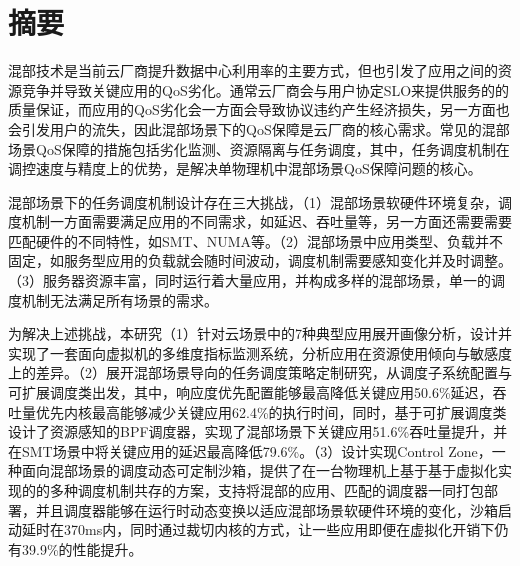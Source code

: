 
\maketitle%
\MAKETITLE%
\makedeclaration%
\intobmk\chapter*{摘\quad 要}%
\setcounter{page}{1}%


混部技术是当前云厂商提升数据中心利用率的主要方式，但也引发了应用之间的资源竞争并导致关键应用的QoS劣化。通常云厂商会与用户协定SLO来提供服务的的质量保证，而应用的QoS劣化会一方面会导致协议违约产生经济损失，另一方面也会引发用户的流失，因此混部场景下的QoS保障是云厂商的核心需求。常见的混部场景QoS保障的措施包括劣化监测、资源隔离与任务调度，其中，任务调度机制在调控速度与精度上的优势，是解决单物理机中混部场景QoS保障问题的核心。

混部场景下的任务调度机制设计存在三大挑战，（1）混部场景软硬件环境复杂，调度机制一方面需要满足应用的不同需求，如延迟、吞吐量等，另一方面还需要需要匹配硬件的不同特性，如SMT、NUMA等。（2）混部场景中应用类型、负载并不固定，如服务型应用的负载就会随时间波动，调度机制需要感知变化并及时调整。（3）服务器资源丰富，同时运行着大量应用，并构成多样的混部场景，单一的调度机制无法满足所有场景的需求。

为解决上述挑战，本研究（1）针对云场景中的7种典型应用展开画像分析，设计并实现了一套面向虚拟机的多维度指标监测系统，分析应用在资源使用倾向与敏感度上的差异。（2）展开混部场景导向的任务调度策略定制研究，从调度子系统配置与可扩展调度类出发，其中，响应度优先配置能够最高降低关键应用50.6\%延迟，吞吐量优先内核最高能够减少关键应用62.4\%的执行时间，同时，基于可扩展调度类设计了资源感知的BPF调度器，实现了混部场景下关键应用51.6\%吞吐量提升，并在SMT场景中将关键应用的延迟最高降低79.6\%。（3）设计实现Control Zone，一种面向混部场景的调度动态可定制沙箱，提供了在一台物理机上基于基于虚拟化实现的的多种调度机制共存的方案，支持将混部的应用、匹配的调度器一同打包部署，并且调度器能够在运行时动态变换以适应混部场景软硬件环境的变化，沙箱启动延时在370ms内，同时通过裁切内核的方式，让一些应用即便在虚拟化开销下仍有39.9\%的性能提升。

